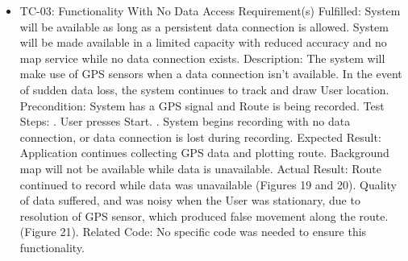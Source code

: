 ﻿\documentclass{article}
\begin{document}
\begin {itemize}
\item TC-03: Functionality With No Data Access
\subitem Requirement(s) Fulfilled:
\subsubitem System will be available as long as a persistent data connection is allowed.
\subsubitem System will be made available in a limited capacity with reduced accuracy and no map service while no data connection exists.
\subitem Description: The system will make use of GPS sensors when a data connection isn't available. In the event of sudden data loss, the system continues to track and draw User location.
\subitem Precondition: System has a GPS signal and Route is being recorded.
\subitem Test Steps:
. User presses Start.
. System begins recording with no data connection, or data connection is lost during recording.
\subitem Expected Result: Application continues collecting GPS data and plotting route. Background map will not be available while data is unavailable.
\subitem Actual Result: Route continued to record while data was unavailable (Figures 19 and 20). Quality of data suffered, and was noisy when the User was stationary, due to resolution of GPS sensor, which produced false movement along the route. (Figure 21).
\subitem Related Code: No specific code was needed to ensure this functionality.
\end {itemize}
\end{document}
